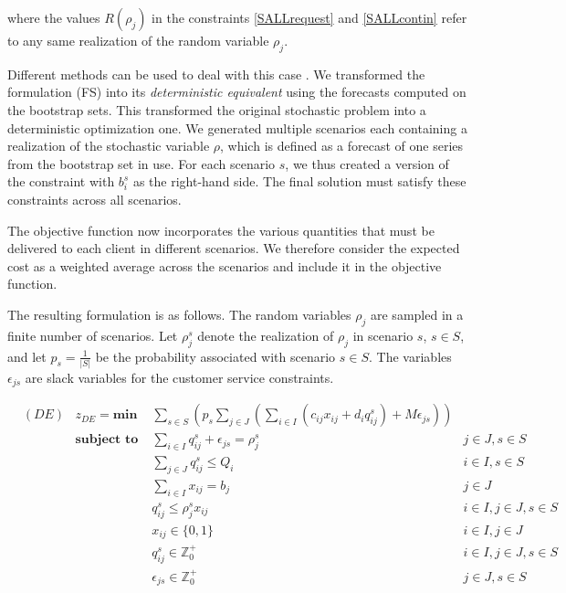 \documentclass[ijoc,sglanonrev]{informs4}
\begin{document}
\noindent where the values $R(\rho_j)$ in the constraints \ref{SALLrequest} and \ref{SALLcontin} refer to any same realization of the random variable $\rho_j$.

Different methods can be used to deal with this case \citep{SDR09}. We transformed the formulation (FS) into its {\it deterministic equivalent} \citep{D55} using the forecasts computed on the bootstrap sets. This transformed the original stochastic problem into a deterministic optimization one. We generated multiple scenarios each containing a realization of the stochastic variable $\rho$, which is defined as a forecast of one series from the bootstrap set in use. For each scenario $s$, we thus created a version of the constraint with $b_i^{s}$ as the right-hand side. The final solution must satisfy these constraints across all scenarios.

The objective function now incorporates the various quantities that must be delivered to each client in different scenarios. We therefore consider the expected cost as a weighted average across the scenarios and include it in the objective function. 

The resulting formulation is as follows. The random variables $\rho_j$ are sampled in a finite number of scenarios. Let $\rho^s_j$ denote the realization of $\rho_j$ in scenario $s$, $s \in S$, and let $p_s = \frac{1}{|S|}$ be the probability associated with scenario $s \in S$. The variables $\epsilon_{js}$ are slack variables for the customer service constraints.

\begin{align}
&(DE) & z_{DE} = \textbf{min } & \sum_{s \in S} \left( p_s \sum_{j \in J} \left( \sum_{i \in I} ( c_{ij}x_{ij} + d_i q_{ij}^s) + M \epsilon_{js} \right) \right) \label{DEobj}\\
& &  \textbf{subject to }
     & \sum_{i \in I} q_{ij}^s + \epsilon_{js} = \rho_j^s & j \in J, s \in S \label{DErequest}\\
& &  & \sum_{j \in J}q_{ij}^s \leq Q_i & i \in I, s \in S \label{DEcapacity}\\
& &  & \sum_{i \in I} x_{ij} = b_j & j \in J  \label{DEnumserv}\\
& &  & q_{ij}^s \leq \rho_j^s x_{ij} & i \in I, j \in J, s \in S \label{DEcontin}\\
& &  & x_{ij} \in \{0,1\} & i\in I, j \in J \label{DEx}\\
& &  & q_{ij}^s \in \mathbb{Z}^+_0 & i\in I, j \in J, s \in S \label{DEq}\\
& &  & \epsilon_{js} \in \mathbb{Z}^+_0 & j \in J, s \in S \label{DEeps}
\end{align}
\end{document}
